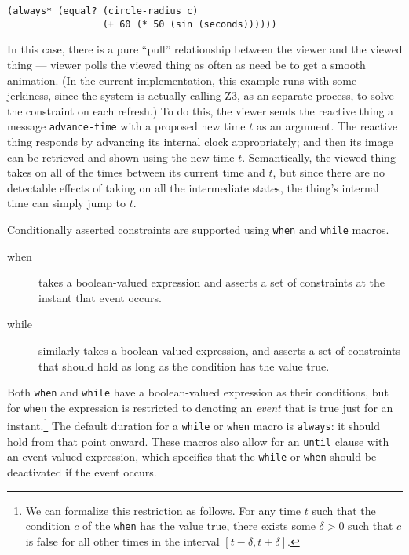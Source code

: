 \documentclass{sig-alternate-05-2015}
\begin{document}
\begin{verbatim}
(always* (equal? (circle-radius c)
                 (+ 60 (* 50 (sin (seconds))))))
\end{verbatim}

In this case, there is a pure ``pull'' relationship between the viewer and
the viewed thing --- viewer polls the viewed thing as often as need be to
get a smooth animation.  (In the current implementation, this example runs
with some jerkiness, since the system is actually calling Z3, as an
separate process, to solve the constraint on each refresh.)  To do this,
the viewer sends the reactive thing a message \verb|advance-time| with a
proposed new time $t$ as an argument.  The reactive thing responds by
advancing its internal clock appropriately; and then its image can be
retrieved and shown using the new time $t$\@.  Semantically, the viewed
thing takes on all of the times between its current time and $t$, but since
there are no detectable effects of taking on all the intermediate states,
the thing's internal time can simply jump to $t$.

Conditionally asserted constraints are supported using \verb|when| and
\verb|while| macros.

\begin{description}
    
\item[when] takes a boolean-valued expression and asserts a set of
  constraints at the instant that event occurs.

\item[while] similarly takes a boolean-valued expression, and asserts a set
  of constraints that should hold as long as the condition has the value
  true.



\end{description}

Both \verb|when| and \verb|while| have a boolean-valued expression as their
conditions, but for \verb|when| the expression is restricted to denoting an
\emph{event} that is true just for an instant.\footnote{We can formalize
  this restriction as follows.  For any time $t$ such that the condition
  $c$ of the {\tt when} has the value true, there exists some $\delta>0$
  such that $c$ is false for all other times in the interval
  $[t-\delta,t+\delta]$.}  The default duration for a \verb|while| or
\verb|when| macro is \verb|always|: it should hold from that point onward.
These macros also allow for an \verb|until| clause with an event-valued
expression, which specifies that the \verb|while| or \verb|when| should be
deactivated if the event occurs.
\end{document}
